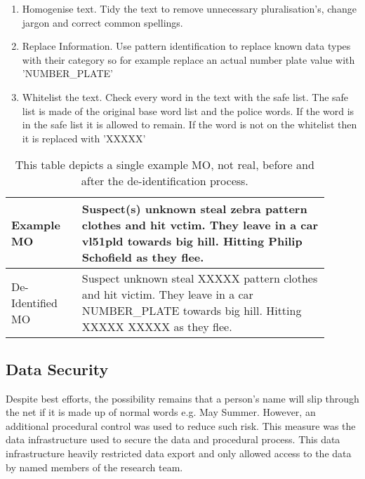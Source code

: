 \begin{enumerate}
    \item Homogenise text. Tidy the text to remove unnecessary pluralisation's, change jargon and correct common spellings.
    \item Replace Information. Use pattern identification to replace known data types with their category so for example replace an actual number plate value with 'NUMBER\_PLATE'
    \item Whitelist the text. Check every word in the text with the safe list. The safe list is made of the original base word list and the police words. If the word is in the safe list it is allowed to remain. If the word is not on the whitelist then it is replaced with 'XXXXX'
\end{enumerate}

\begin{table}[]
\centering
\begin{tabular}{p{0.2\linewidth}|p{0.7\linewidth}}
\toprule
Example MO       & Suspect(s) unknown steal zebra pattern clothes and hit vctim. They leave in a car vl51pld towards big hill. Hitting Philip Schofield as they flee. \\ \midrule
De-Identified MO & Suspect unknown steal XXXXX pattern clothes and hit victim. They leave in a car NUMBER\_PLATE towards big hill. Hitting XXXXX XXXXX as they flee.    \\ \bottomrule
\end{tabular}
\caption[Example MO de-identification process]{\label{Example_deident} This table depicts a single example MO, not real, before and after the de-identification process.}
\end{table}


\subsection{Data Security} Despite best efforts, the possibility remains that a person’s name will slip through the net if it is made up of normal words e.g. May Summer. However, an additional procedural control was used to reduce such risk. This measure was the data infrastructure used to secure the data and procedural process. This data infrastructure heavily restricted data export and only allowed access to the data by named members of the research team. 

